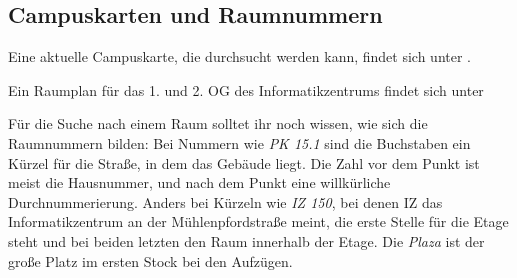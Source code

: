 
\subsection{Campuskarten und Raumnummern}
\label{campuskarte}
Eine aktuelle Campuskarte, die durchsucht werden kann, findet sich unter .

Ein Raumplan für das 1. und 2. OG des Informatikzentrums findet sich
unter 


Für die Suche nach einem Raum solltet ihr noch wissen, wie sich die Raumnummern bilden: Bei Nummern wie \textit{PK 15.1} sind die Buchstaben ein Kürzel für die Straße, in dem das Gebäude liegt. Die Zahl vor dem Punkt ist meist die Hausnummer, und nach dem Punkt eine willkürliche Durchnummerierung. Anders bei Kürzeln wie \textit{IZ 150}, bei denen IZ das Informatikzentrum an der Mühlenpfordstraße meint, die erste Stelle für die Etage steht und bei beiden letzten den Raum innerhalb der Etage. Die \textit{Plaza} ist der große Platz im ersten Stock bei den Aufzügen.
